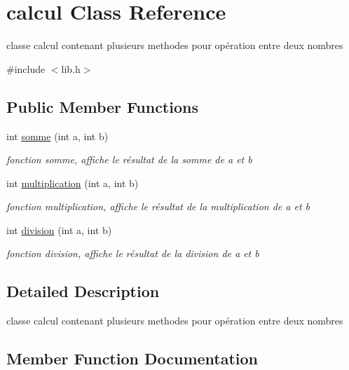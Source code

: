 \hypertarget{classcalcul}{}\section{calcul Class Reference}
\label{classcalcul}


classe calcul contenant plusieurs methodes pour opération entre deux nombres  




{\ttfamily \#include $<$lib.\+h$>$}

\subsection*{Public Member Functions}
\begin{DoxyCompactItemize}
\item 
int \hyperlink{classcalcul_ab14285ae1d20ec9afcfe321d4b75e539}{somme} (int a, int b)
\begin{DoxyCompactList}\small\item\em fonction somme, affiche le résultat de la somme de a et b \end{DoxyCompactList}\item 
int \hyperlink{classcalcul_a3d56b5d12097e4797e0660ff18172dff}{multiplication} (int a, int b)
\begin{DoxyCompactList}\small\item\em fonction multiplication, affiche le résultat de la multiplication de a et b \end{DoxyCompactList}\item 
int \hyperlink{classcalcul_abfd4dbfee38b4220a0062deaa8220c8f}{division} (int a, int b)
\begin{DoxyCompactList}\small\item\em fonction division, affiche le résultat de la division de a et b \end{DoxyCompactList}\end{DoxyCompactItemize}


\subsection{Detailed Description}
classe calcul contenant plusieurs methodes pour opération entre deux nombres 

\subsection{Member Function Documentation}

